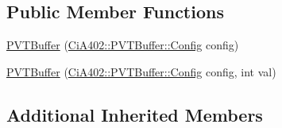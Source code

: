 \subsection*{Public Member Functions}
\begin{DoxyCompactItemize}
\item 
\hyperlink{struct_ci_a402_1_1_p_v_t_buffer_a24a833e7ab9badfd6a2b97aa8c2a8223}{P\-V\-T\-Buffer} (\hyperlink{struct_ci_a402_1_1_p_v_t_buffer_ab39588e1f028f9838c2a85fce3f74926}{Ci\-A402\-::\-P\-V\-T\-Buffer\-::\-Config} config)
\item 
\hyperlink{struct_ci_a402_1_1_p_v_t_buffer_ad526b5b56d2f5d98a77f90d4dde11fc6}{P\-V\-T\-Buffer} (\hyperlink{struct_ci_a402_1_1_p_v_t_buffer_ab39588e1f028f9838c2a85fce3f74926}{Ci\-A402\-::\-P\-V\-T\-Buffer\-::\-Config} config, int val)
\end{DoxyCompactItemize}
\subsection*{Additional Inherited Members}


